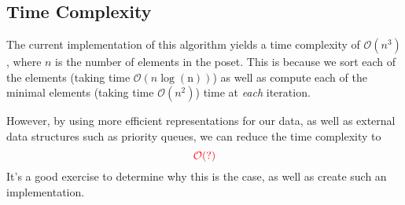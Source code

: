 \documentclass{article}
\begin{document}
\subsection*{Time Complexity}
    The current implementation of this algorithm yields a time complexity of $\mathcal{O}(n^{3})$, where $n$ is the number of elements in the poset. This is because we sort each of the elements (taking time $\mathcal{O}(n\log(\text{n}))$) as well as compute each of the minimal elements (taking time $\mathcal{O}(n^{2})$) time at \textit{each} iteration.

    \vspace{2mm}
    However, by using more efficient representations for our data, as well as external data structures such as priority queues, we can reduce the time complexity to $$\textcolor{red}{\mathcal{O}(?)}$$ It's a good exercise to determine why this is the case, as well as create such an implementation.
\end{document}
